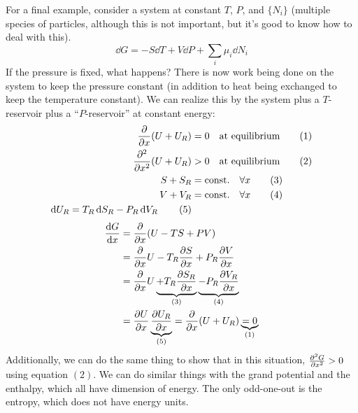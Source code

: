 \documentclass[a4paper,twoside,master.tex]{subfiles}
\begin{document}
For a final example, consider a system at constant $ T $, $ P $, and $ \{N_i\} $ (multiple species of particles, although this is not important, but it's good to know how to deal with this).
\begin{equation}
    \dd{G} = - S \dd{T} + V \dd{P} + \sum_i \mu_i \dd{N_i}
\end{equation}
If the pressure is fixed, what happens? There is now work being done on the system to keep the pressure constant (in addition to heat being exchanged to keep the temperature constant). We can realize this by the system plus a $ T $-reservoir plus a ``$ P $-reservoir'' at constant energy:
\begin{align}
    \pdv{x}(U + U_R) &= 0\quad \text{at equilibrium} \qquad (1)\\
    \pdv[2]{x}(U + U_R) &> 0\quad \text{at equilibrium} \qquad (2) \\
    S + S_R &= \text{const.}\quad \forall x \qquad (3) \\
    V + V_R &= \text{const.}\quad \forall x \qquad (4) \\
    \dd{U_R} = T_R \dd{S_R} - P_R \dd{V_R} \qquad (5)
\end{align}
\begin{align}
    \dv{G}{x} &= \pdv{x}(U - TS + PV) \\
    &= \pdv{x}U - T_R \pdv{S}{x} + P_R \pdv{V}{x} \\
    &= \pdv{x}U \underbrace{+ T_R \pdv{S_R}{x}}_{(3)} \underbrace{- P_R \pdv{V_R}{x}}_{(4)} \\
    &= \pdv{U}{x} \underbrace{\pdv{U_R}{x}}_{(5)} = \pdv{x}(U + U_R) \underbrace{= 0}_{(1)}
\end{align}
Additionally, we can do the same thing to show that in this situation, $ \pdv[2]{G}{x} > 0 $ using equation $ (2) $. We can do similar things with the grand potential and the enthalpy, which all have dimension of energy. The only odd-one-out is the entropy, which does not have energy units.
\end{document}
